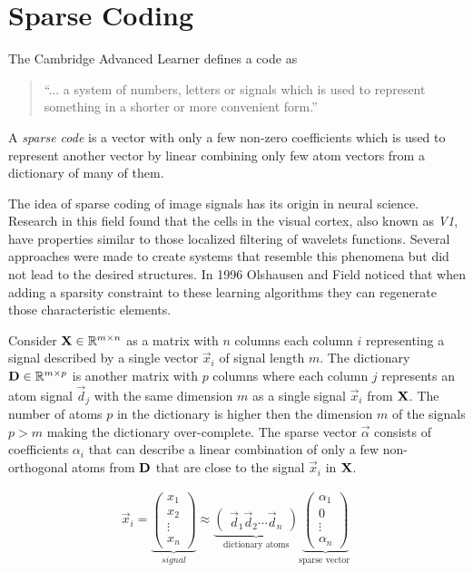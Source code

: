 \chapter{Sparse Coding}
\label{chap:sparse_coding}

The Cambridge Advanced Learner defines a code as
\begin{quotation}
``... a system of numbers, letters or signals which is used to represent
something in a shorter or more convenient form.''
\end{quotation}
A \emph{sparse code} is a vector with only a few non-zero coefficients
which is used to represent another vector by linear combining only few atom
vectors from a dictionary of many of them.

The idea of sparse coding of image signals has its origin in neural science. 
Research in this field found that the cells in the visual cortex, also known as
\emph{V1}, have properties similar to those localized filtering of wavelets
functions. Several approaches were made to create systems that resemble this
phenomena but did not lead to the desired structures. In 1996 Olshausen and
Field\cite{Olshausen1996} noticed that when adding a sparsity constraint to
these learning algorithms they can regenerate those characteristic elements.

\newpage %
Consider $\boldsymbol{\mathrm{X}} \in \mathbb{R}^{m\times n}$  as a matrix with $n$ columns each
column $i$ representing a signal described by a single vector $\vec{x}_{i}$ of
signal length $m$. The dictionary $\boldsymbol{\mathrm{D}}\in\mathbb{R}^{m \times p}$ is another
matrix with $p$ columns where each column $j$ represents an atom signal
$\vec{d}_j$ with the same dimension $m$ as a single signal $\vec{x}_{i}$ from
$\boldsymbol{\mathrm{X}}$. The number of atoms $p$ in the dictionary is higher then the
dimension $m$ of the signals $p > m$ making the dictionary over-complete. The
sparse vector $\vec{\alpha}$ consists of coefficients $\alpha_i$ that can
describe a linear
combination of only a few non-orthogonal atoms from $\boldsymbol{\mathrm{D}}$ that are close to
the signal $\vec{x}_i $ in $\boldsymbol{\mathrm{X}}$. 

\begin{align*}
\vec{x}_i = \underbrace{\begin{pmatrix} x_1 \\ x_2 \\ \vdots \\ x_n
\end{pmatrix}}_{signal}
\approx \underbrace{\begin{pmatrix} \vec{d}_1  \vec{d}_2 \cdots \vec{d}_n
\end{pmatrix}}_{\textrm{dictionary atoms}}
\underbrace{\begin{pmatrix} \alpha_1 \\ 0 \\ \vdots \\ \alpha_n
\end{pmatrix}}_{\textrm{sparse vector }}
\end{align*}


